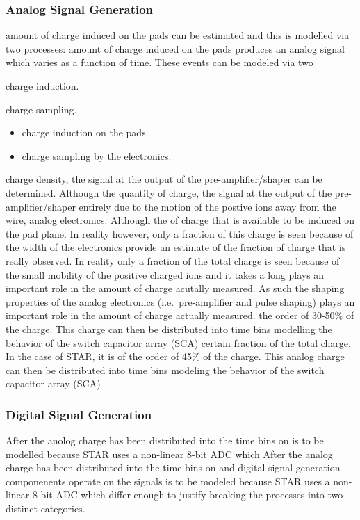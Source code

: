 \documentclass[twoside]{article}
\begin{document}
\subsubsection{Analog Signal Generation}
amount of charge induced on the pads can be estimated and this is
modelled via two processes:
amount of charge induced on the pads produces an analog signal which
varies as a function of time.  These events can be modeled via two 
  \item charge induction.
  \item charge sampling.
\begin{itemize}
  \item charge induction on the pads.
  \item charge sampling by the electronics.
\end{itemize}
charge density, the signal at the output of the pre-amplifier/shaper
can be determined.  Although the
quantity of charge, the signal at the output of the pre-amplifier/shaper
entirely due to the motion of the postive ions away from the wire, 
analog electronics.  Although the
of charge that is available to be induced on the pad plane.  In reality
however, only a fraction of this charge is seen because of the
width of the electronics provide an estimate of the fraction of charge
that is really observed.  In reality only a fraction of the total charge 
is seen because of the
small mobility of the positive charged ions and it takes a long
plays an important role in the amount of charge acutally measured.
As such the shaping 
properties of the analog electronics (i.e.~pre-amplifier and pulse shaping)
plays an important role in the amount of charge actually measured.
the order of 30-50\% of the charge.  This charge can then be distributed
into time bins modelling the behavior of the switch capacitor array (SCA)
certain fraction of the total charge.  In the case of STAR, it is of
the order of 45\% of the charge.  This analog charge can then be distributed
into time bins modeling the behavior of the switch capacitor array (SCA)

\subsubsection{Digital Signal Generation}
After the anolog charge has been distributed into the time bins on
is to be modelled because STAR uses a non-linear 8-bit ADC which
After the analog charge has been distributed into the time bins on
and digital signal generation componenents operate on the signals
is to be modeled because STAR uses a non-linear 8-bit ADC which
differ enough to justify breaking the processes into two distinct
categories.
\end{document}
